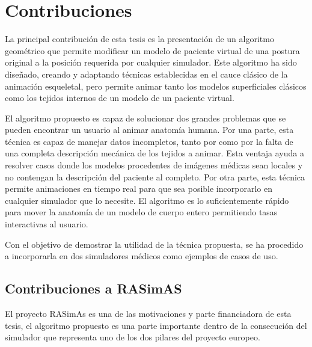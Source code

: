 \section{Contribuciones}
\label{intro:contribuciones}

La principal contribución de esta tesis es la presentación de un algoritmo geométrico que permite modificar un modelo de paciente virtual de una postura original a la posición requerida por cualquier simulador. Este algoritmo ha sido diseñado, creando y adaptando técnicas establecidas en el cauce clásico de la animación esqueletal, pero permite animar tanto los modelos superficiales clásicos como los tejidos internos de un modelo de un paciente virtual.

El algoritmo propuesto es capaz de solucionar dos grandes problemas que se pueden encontrar un usuario al animar anatomía humana. Por una parte, esta técnica es capaz de manejar datos incompletos, tanto por %
como por la falta de una completa descripción mecánica de los tejidos a animar. Esta ventaja ayuda a resolver casos donde los modelos procedentes de imágenes médicas sean locales y no contengan la descripción del paciente al completo. Por otra parte, esta técnica permite animaciones en tiempo real para que sea posible incorporarlo en cualquier simulador que lo necesite. El algoritmo es lo suficientemente rápido para mover la anatomía de un modelo de cuerpo entero permitiendo tasas interactivas al usuario.

Con el objetivo de demostrar la utilidad de la técnica propuesta, se ha procedido a incorporarla en dos simuladores médicos como ejemplos de casos de uso. 

\subsection{Contribuciones a RASimAS}

El proyecto \ac{RASimAs} es una de las motivaciones y parte financiadora de esta tesis, el algoritmo propuesto es una parte importante dentro de la consecución del simulador que representa uno de los dos pilares del proyecto europeo.  


